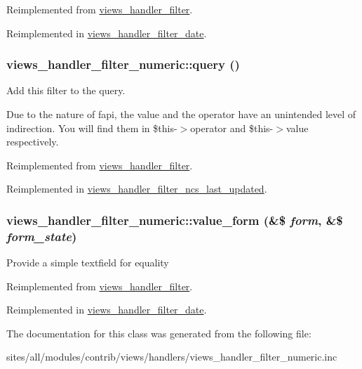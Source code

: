 Reimplemented from \hyperlink{classviews__handler__filter_053c9173084f1409a92eb390854ec304}{views\_\-handler\_\-filter}.

Reimplemented in \hyperlink{classviews__handler__filter__date_5fdeb678009a8c8c23395826caee3062}{views\_\-handler\_\-filter\_\-date}.\hypertarget{classviews__handler__filter__numeric_aa5c6b227651bd1676850f5999f2a897}{
\subsubsection[{query}]{\setlength{\rightskip}{0pt plus 5cm}views\_\-handler\_\-filter\_\-numeric::query ()}}
\label{classviews__handler__filter__numeric_aa5c6b227651bd1676850f5999f2a897}


Add this filter to the query.

Due to the nature of fapi, the value and the operator have an unintended level of indirection. You will find them in \$this-$>$operator and \$this-$>$value respectively. 

Reimplemented from \hyperlink{classviews__handler__filter_8e513b3abbc2559f37b550ca4957b4ae}{views\_\-handler\_\-filter}.

Reimplemented in \hyperlink{classviews__handler__filter__ncs__last__updated_fdcfcb18506212eb4b5df8b19971ff48}{views\_\-handler\_\-filter\_\-ncs\_\-last\_\-updated}.\hypertarget{classviews__handler__filter__numeric_b0888218590f7c620f10fc04a98d135e}{
\subsubsection[{value\_\-form}]{\setlength{\rightskip}{0pt plus 5cm}views\_\-handler\_\-filter\_\-numeric::value\_\-form (\&\$ {\em form}, \/  \&\$ {\em form\_\-state})}}
\label{classviews__handler__filter__numeric_b0888218590f7c620f10fc04a98d135e}


Provide a simple textfield for equality 

Reimplemented from \hyperlink{classviews__handler__filter_9168b39edae84b20e01a3fd0d810ba66}{views\_\-handler\_\-filter}.

Reimplemented in \hyperlink{classviews__handler__filter__date_5c7fb298feef092a2cb3bc3f75f54f29}{views\_\-handler\_\-filter\_\-date}.

The documentation for this class was generated from the following file:\begin{CompactItemize}
\item 
sites/all/modules/contrib/views/handlers/views\_\-handler\_\-filter\_\-numeric.inc\end{CompactItemize}
